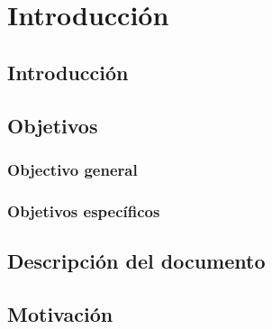 \chapter{Introducción}
\section{Introducción}
\section{Objetivos}
\subsection{Objectivo general}
\subsection{Objetivos específicos}
\section{Descripción del documento}
\section{Motivación}

